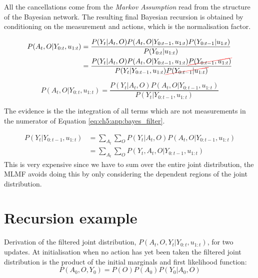 \begin{appendices}
All the cancellations come from the \textit{Markov Assumption} read from the structure of the Bayesian network.
The resulting final Bayesian recursion is obtained by conditioning on the measurement and actions, which is the normalisation factor.

\begin{align}\label{eq:ch5_measurement_update}
 P(A_t,O|Y_{0:t},u_{1:t}) &= \frac{P(Y_t|A_{t},O)  P(A_t,O|Y_{0:t-1},u_{1:t})  P(Y_{0:t-1}|u_{1:t})}{P(Y_{0:t}|u_{1:t})} \nonumber \\
			  &= \frac{P(Y_t|A_{t},O)  P(A_t,O|Y_{0:t-1},u_{1:t})  \Ccancel[red]{P(Y_{0:t-1},u_{1:t})}}{P(Y_t|Y_{0:t-1},u_{1:t}) \Ccancel[red]{P(Y_{0:t-1}|u_{1:t})}}   
\end{align}
 
\begin{equation}
   P(A_t,O|Y_{0:t},u_{1:t}) = \frac{P(Y_t|A_{t},O) P(A_{t},O|Y_{0:t-1},u_{1:t})}{P(Y_t|Y_{0:t-1},u_{1:t})} \label{eq:ch5:app:bayes_filter}
\end{equation}

The evidence is the the integration of all terms which are not measurements in the numerator of Equation \ref{eq:ch5:app:bayes_filter}.

\begin{align}
 P(Y_t|Y_{0:t-1},u_{1:t}) &= \sum\limits_{A_t} \sum\limits_O  P(Y_t|A_{t},O) P(A_{t},O|Y_{0:t-1},u_{1:t}) \\
			  &= \sum\limits_{A_t} \sum\limits_O  P(Y_t,A_{t},O|Y_{0:t-1},u_{1:t})
\end{align}
This is very expensive since we have to sum over the entire joint distribution, the MLMF avoids doing this by only considering the dependent 
regions of the joint distribution.

\section{Recursion example}\label{appendix:recursion_example}

Derivation of the filtered joint distribution, $P(A_t,O,Y_t|Y_{0:t},u_{1:t})$, for 
two updates. At initialisation when no action has yet been taken the filtered joint distribution 
is the product of the initial marginals and first likelihood function:
\begin{equation}
  P(A_0,O,Y_0) = P(O) P(A_0) P(Y_0|A_0,O) 
\end{equation}
  

\end{appendices}
